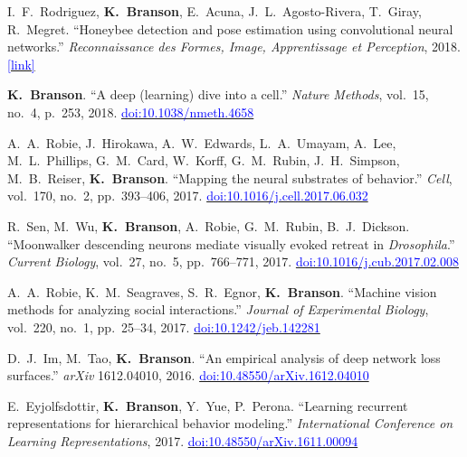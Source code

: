 \begin{cvenum}
\item I.~F.~Rodriguez, {\bf K.~Branson}, E.~Acuna, J.~L.~Agosto-Rivera, T.~Giray, R.~Megret. ``Honeybee detection and pose estimation using convolutional neural networks.'' {\em Reconnaissance des Formes, Image, Apprentissage et Perception}, 2018. \href{https://bigdbee.hpcf.upr.edu/wordpress/wp-content/uploads/rfiap2018_final.pdf}{\small\textcolor{blue}{[link]}}

\item {\bf K.~Branson}. ``A deep (learning) dive into a cell.'' {\em Nature Methods}, vol.~15, no.~4, p.~253, 2018. \href{https://doi.org/10.1038/nmeth.4658}{\small\textcolor{blue}{doi:10.1038/nmeth.4658}}

\item A.~A.~Robie, J.~Hirokawa, A.~W.~Edwards, L.~A.~Umayam, A.~Lee, M.~L.~Phillips, G.~M.~Card, W.~Korff, G.~M.~Rubin, J.~H.~Simpson, M.~B.~Reiser, {\bf K.~Branson}. ``Mapping the neural substrates of behavior.'' {\em Cell}, vol.~170, no.~2, pp.~393--406, 2017. \href{https://doi.org/10.1016/j.cell.2017.06.032}{\small\textcolor{blue}{doi:10.1016/j.cell.2017.06.032}}

\item R.~Sen, M.~Wu, {\bf K.~Branson}, A.~Robie, G.~M.~Rubin, B.~J.~Dickson. ``Moonwalker descending neurons mediate visually evoked retreat in {\em {D}rosophila}.'' {\em Current Biology}, vol.~27, no.~5, pp.~766--771, 2017. \href{https://doi.org/10.1016/j.cub.2017.02.008}{\small\textcolor{blue}{doi:10.1016/j.cub.2017.02.008}}

\item A.~A.~Robie, K.~M.~Seagraves, S.~R.~Egnor, {\bf K.~Branson}. ``Machine vision methods for analyzing social interactions.'' {\em Journal of Experimental Biology}, vol.~220, no.~1, pp.~25--34, 2017. \href{https://doi.org/10.1242/jeb.142281}{\small\textcolor{blue}{doi:10.1242/jeb.142281}}

\item D.~J.~Im, M.~Tao, {\bf K.~Branson}. ``An empirical analysis of deep network loss surfaces.'' {\em arXiv} 1612.04010, 2016. \href{https://doi.org/10.48550/arXiv.1612.04010}{\small\textcolor{blue}{doi:10.48550/arXiv.1612.04010}}

\item E.~Eyjolfsdottir, {\bf K.~Branson}, Y.~Yue, P.~Perona. ``Learning recurrent representations for hierarchical behavior modeling.'' {\em International Conference on Learning Representations}, 2017. \href{https://openreview.net/forum?id=BkLhzHtlg}{\small\textcolor{blue}{doi:10.48550/arXiv.1611.00094}}


\end{cvenum}
